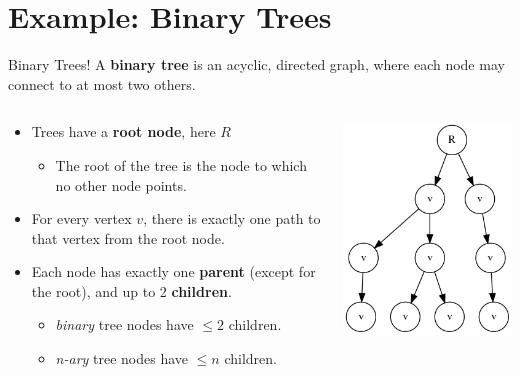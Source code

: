 \documentclass[11pt]{beamer}
\begin{document}
\section[Trees]{Example: Binary Trees}

\begin{frame}{Binary Trees!}
A \textbf{binary tree} is an acyclic, directed graph, where each node may connect to at most two others.  
\begin{columns}
\begin{column}{0.65\textwidth}
\begin{itemize}
\item Trees have a \textbf{root node}, here $R$
\begin{itemize}
\item The root of the tree is the node to which no other node points. 
\end{itemize}
\item For every vertex $v$, there is exactly one path to that vertex from the root node.  
\item Each node has exactly one \textbf{parent} (except for the root), and up to 2 \textbf{children}.  
\begin{itemize}
\item \emph{binary} tree nodes have $\leq 2$ children. 
\item \emph{n-ary} tree nodes have $\leq n$ children.
\end{itemize}
\end{itemize}
\end{column}
\begin{column}{0.35\textwidth}
\center
\includegraphics[scale=0.4]{tree1.png}
\end{column}
\end{columns}
\end{frame}
\end{document}
